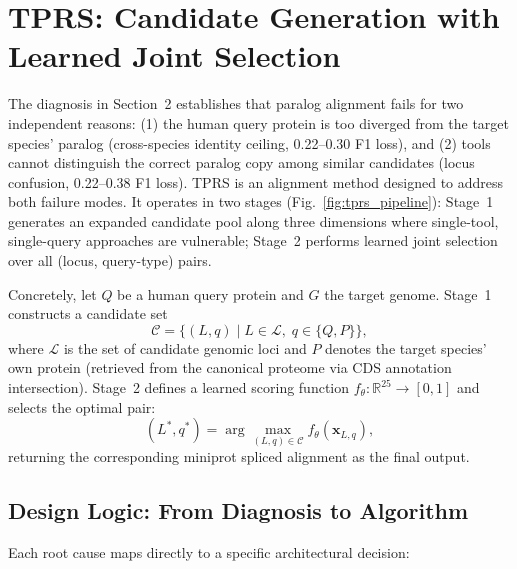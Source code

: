 \section{TPRS: Candidate Generation with Learned Joint Selection}

The diagnosis in Section~2 establishes that paralog alignment fails for two independent reasons: (1) the human query protein is too diverged from the target species' paralog (cross-species identity ceiling, 0.22--0.30 F1 loss), and (2) tools cannot distinguish the correct paralog copy among similar candidates (locus confusion, 0.22--0.38 F1 loss). TPRS is an alignment method designed to address both failure modes. It operates in two stages (Fig.~\ref{fig:tprs_pipeline}): Stage~1 generates an expanded candidate pool along three dimensions where single-tool, single-query approaches are vulnerable; Stage~2 performs learned joint selection over all (locus, query-type) pairs.

Concretely, let $Q$ be a human query protein and $G$ the target genome. Stage~1 constructs a candidate set
\begin{equation}
\mathcal{C} = \{(L, q) \mid L \in \mathcal{L},\; q \in \{Q, P\}\},
\label{eq:candidate_set}
\end{equation}
where $\mathcal{L}$ is the set of candidate genomic loci and $P$ denotes the target species' own protein (retrieved from the canonical proteome via CDS annotation intersection). Stage~2 defines a learned scoring function $f_\theta: \mathbb{R}^{25} \to [0,1]$ and selects the optimal pair:
\begin{equation}
(L^*, q^*) = \arg\max_{(L, q) \in \mathcal{C}} f_\theta(\mathbf{x}_{L, q}),
\label{eq:selection}
\end{equation}
returning the corresponding miniprot spliced alignment as the final output.

\subsection{Design Logic: From Diagnosis to Algorithm}

Each root cause maps directly to a specific architectural decision:


